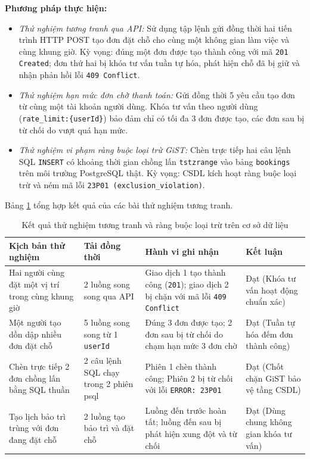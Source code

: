 \noindent\textbf{Phương pháp thực hiện:}
\begin{itemize}
    \item \textit{Thử nghiệm tương tranh qua API:} Sử dụng tập lệnh gửi đồng thời hai tiến trình HTTP POST tạo đơn đặt chỗ cho cùng một không gian làm việc và cùng khung giờ. Kỳ vọng: đúng một đơn được tạo thành công với mã \texttt{201 Created}; đơn thứ hai bị khóa tư vấn tuần tự hóa, phát hiện chỗ đã bị giữ và nhận phản hồi lỗi \texttt{409 Conflict}.
    \item \textit{Thử nghiệm hạn mức đơn chờ thanh toán:} Gửi đồng thời 5 yêu cầu tạo đơn từ cùng một tài khoản người dùng. Khóa tư vấn theo người dùng (\texttt{rate\_limit:\{userId\}}) bảo đảm chỉ có tối đa 3 đơn được tạo, các đơn sau bị từ chối do vượt quá hạn mức.
    \item \textit{Thử nghiệm vi phạm ràng buộc loại trừ GiST:} Chèn trực tiếp hai câu lệnh SQL \texttt{INSERT} có khoảng thời gian chồng lấn \texttt{tstzrange} vào bảng \texttt{bookings} trên môi trường PostgreSQL thật. Kỳ vọng: CSDL kích hoạt ràng buộc loại trừ và ném mã lỗi \texttt{23P01 (exclusion\_violation)}.
\end{itemize}

Bảng \ref{tab:kt_tuongtranh} tổng hợp kết quả của các bài thử nghiệm tương tranh.

\begin{table}[H]
\centering
\caption{Kết quả thử nghiệm tương tranh và ràng buộc loại trừ trên cơ sở dữ liệu}
\label{tab:kt_tuongtranh}
\small
\renewcommand{\arraystretch}{1.25}
\begin{tabular}{|p{3.8cm}|p{3.0cm}|p{4.2cm}|p{2.6cm}|}
\hline
\textbf{Kịch bản thử nghiệm} & \textbf{Tải đồng thời} & \textbf{Hành vi ghi nhận} & \textbf{Kết luận} \\
\hline
Hai người cùng đặt một vị trí trong cùng khung giờ & 2 luồng song song qua API & Giao dịch 1 tạo thành công (\texttt{201}); giao dịch 2 bị chặn với mã lỗi \texttt{409 Conflict} & Đạt (Khóa tư vấn hoạt động chuẩn xác) \\
\hline
Một người tạo dồn dập nhiều đơn đặt chỗ & 5 luồng song song từ 1 \texttt{userId} & Đúng 3 đơn được tạo; 2 đơn sau bị từ chối do chạm hạn mức 3 đơn chờ & Đạt (Tuần tự hóa đếm đơn thành công) \\
\hline
Chèn trực tiếp 2 đơn chồng lấn bằng SQL thuần & 2 câu lệnh SQL chạy trong 2 phiên psql & Phiên 1 chèn thành công; Phiên 2 bị từ chối với lỗi \texttt{ERROR: 23P01} & Đạt (Chốt chặn GiST bảo vệ tầng CSDL) \\
\hline
Tạo lịch bảo trì trùng với đơn đang đặt chỗ & 2 luồng tạo bảo trì và đặt chỗ & Luồng đến trước hoàn tất; luồng đến sau bị phát hiện xung đột và từ chối & Đạt (Dùng chung không gian khóa tư vấn) \\
\hline
\end{tabular}
\end{table}

